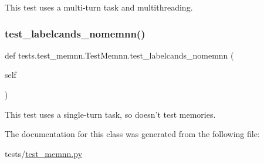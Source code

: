 \begin{DoxyVerb}This test uses a multi-turn task and multithreading.
\end{DoxyVerb}
 \mbox{\label{classtests_1_1test__memnn_1_1TestMemnn_a3e3c10325fc7905dc77b8e1b1db4490a}} 
\subsubsection{\texorpdfstring{test\+\_\+labelcands\+\_\+nomemnn()}{test\_labelcands\_nomemnn()}}
{\footnotesize\ttfamily def tests.\+test\+\_\+memnn.\+Test\+Memnn.\+test\+\_\+labelcands\+\_\+nomemnn (\begin{DoxyParamCaption}\item[{}]{self }\end{DoxyParamCaption})}

\begin{DoxyVerb}This test uses a single-turn task, so doesn't test memories.
\end{DoxyVerb}
 

The documentation for this class was generated from the following file\+:\begin{DoxyCompactItemize}
\item 
tests/\hyperlink{test__memnn_8py}{test\+\_\+memnn.\+py}\end{DoxyCompactItemize}
